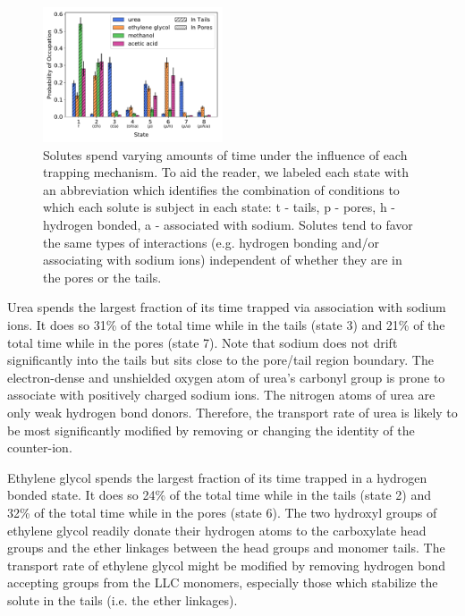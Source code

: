 \documentclass[journal=jctcce,manuscript=article]{achemso}
\begin{document}
  \begin{figure}
  \centering
  \includegraphics[width=0.475\textwidth]{state_probabilities.pdf}
  \caption{Solutes spend varying amounts of time under the influence of each
	  trapping mechanism. To aid the reader, we labeled each state with an
	  abbreviation which identifies the combination of conditions to which
	  each solute is subject in each state: t - tails, p - pores, h -
	  hydrogen bonded, a - associated with sodium. Solutes tend to favor
	  the same types of interactions (e.g. hydrogen bonding and/or
	  associating with sodium ions) independent of whether they are in the
	  pores or the tails.}\label{fig:state_probabilities}
  \end{figure}

  Urea spends the largest fraction of its time trapped via association with
  sodium ions. It does so 31\% of the total time while in the tails (state 3)
  and 21\% of the total time while in the pores (state 7). Note that sodium
  does not drift significantly into the tails but sits close to the pore/tail
  region boundary. The electron-dense and unshielded oxygen atom of urea's
  carbonyl group is prone to associate with positively charged sodium ions. The
  nitrogen atoms of urea are only weak hydrogen bond donors. Therefore, the
  transport rate of urea is likely to be most significantly modified by
  removing or changing the identity of the counter-ion.
  
  Ethylene glycol spends the largest fraction of its time trapped in a hydrogen
  bonded state. It does so 24\% of the total time while in the tails (state 2)
  and 32\% of the total time while in the pores (state 6). The two hydroxyl
  groups of ethylene glycol readily donate their hydrogen atoms to the
  carboxylate head groups and the ether linkages between the head groups and
  monomer tails. The transport rate of ethylene glycol might be modified by
  removing hydrogen bond accepting groups from the LLC monomers, especially
  those which stabilize the solute in the tails (i.e. the ether linkages). 
  
\end{document}
